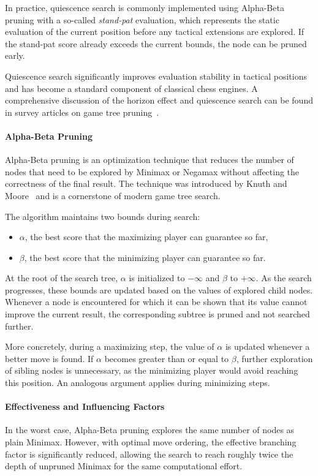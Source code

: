 In practice, quiescence search is commonly implemented using Alpha-Beta pruning
with a so-called \emph{stand-pat} evaluation, which represents the static
evaluation of the current position before any tactical extensions are explored.
If the stand-pat score already exceeds the current bounds, the node can be
pruned early.

Quiescence search significantly improves evaluation stability in tactical
positions and has become a standard component of classical chess engines. A
comprehensive discussion of the horizon effect and quiescence search can be
found in survey articles on game tree pruning~\cite{marsland1986review}.

\paragraph{Alpha-Beta Pruning}
Alpha-Beta pruning is an optimization technique that reduces the number of nodes
that need to be explored by Minimax or Negamax without affecting the correctness
of the final result. The technique was introduced by Knuth and Moore~\cite{knuth1975alphabeta}
and is a cornerstone of modern game tree search.

The algorithm maintains two bounds during search:
\begin{itemize}
    \item $\alpha$, the best score that the maximizing player can guarantee so
    far,
    \item $\beta$, the best score that the minimizing player can guarantee so
    far.
\end{itemize}

At the root of the search tree, $\alpha$ is initialized to $-\infty$ and $\beta$
to $+\infty$. As the search progresses, these bounds are updated based on the
values of explored child nodes. Whenever a node is encountered for which it can
be shown that its value cannot improve the current result, the corresponding
subtree is pruned and not searched further.

More concretely, during a maximizing step, the value of $\alpha$ is updated
whenever a better move is found. If $\alpha$ becomes greater than or equal to
$\beta$, further exploration of sibling nodes is unnecessary, as the minimizing
player would avoid reaching this position. An analogous argument applies during
minimizing steps.

\paragraph{Effectiveness and Influencing Factors}
In the worst case, Alpha-Beta pruning explores the same number of nodes as plain
Minimax. However, with optimal move ordering, the effective branching factor is
significantly reduced, allowing the search to reach roughly twice the depth of
unpruned Minimax for the same computational effort.

